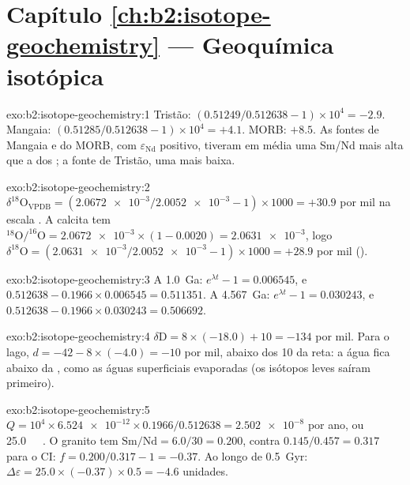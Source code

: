 \section*{Capítulo \ref{ch:b2:isotope-geochemistry} --- Geoquímica isotópica}

\begin{solution}{exo:b2:isotope-geochemistry:1}
Tristão: $(0.51249/0.512638 - 1)\times10^4 = -2.9$. Mangaia: $(0.51285/0.512638 -
1)\times10^4 = +4.1$. MORB: $+8.5$. As fontes de Mangaia e do MORB, com
$\varepsilon_{\mathrm{Nd}}$ positivo, tiveram em média uma Sm/Nd mais alta que a dos ; a
fonte de Tristão, uma mais baixa.
\end{solution}

\begin{solution}{exo:b2:isotope-geochemistry:2}
$\delta^{18}\mathrm{O}_{\mathrm{VPDB}} = (\num{2.0672e-3}/\num{2.0052e-3} - 1)\times1000 =
+30.9$ por mil na escala . A calcita tem $^{18}\mathrm{O}/^{16}\mathrm{O} =
\num{2.0672e-3}\times(1 - 0.0020) = \num{2.0631e-3}$, logo $\delta^{18}\mathrm{O} =
(\num{2.0631e-3}/\num{2.0052e-3} - 1)\times1000 = +28.9$ por mil ().
\end{solution}

\begin{solution}{exo:b2:isotope-geochemistry:3}
A \qty{1.0}{Ga}: $e^{\lambda t} - 1 = 0.006545$, e $0.512638 - 0.1966\times0.006545 =
0.511351$. A \qty{4.567}{Ga}: $e^{\lambda t}-1 = 0.030243$, e $0.512638 -
0.1966\times0.030243 = 0.506692$.
\end{solution}

\begin{solution}{exo:b2:isotope-geochemistry:4}
$\delta\mathrm{D} = 8\times(-18.0) + 10 = -134$ por mil. Para o lago, $d = -42 -
8\times(-4.0) = -10$ por mil, abaixo dos 10 da reta: a água fica abaixo da , como as águas superficiais evaporadas (os isótopos leves saíram primeiro).
\end{solution}

\begin{solution}{exo:b2:isotope-geochemistry:5}
$Q = 10^4\times\num{6.524e-12}\times0.1966/0.512638 = \num{2.502e-8}$ por ano, ou
\qty{25.0}{\per\giga\year}. O granito tem $\mathrm{Sm}/\mathrm{Nd} = 6.0/30 = 0.200$,
contra $0.145/0.457 = 0.317$ para o CI: $f = 0.200/0.317 - 1 = -0.37$. Ao longo de
\qty{0.5}{Gyr}: $\Delta\varepsilon = 25.0\times(-0.37)\times0.5 = -4.6$ unidades.
\end{solution}


